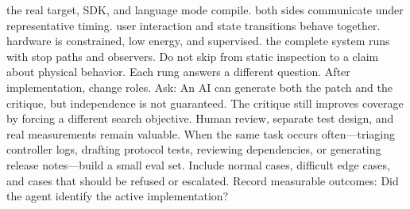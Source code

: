  the real target, SDK, and language mode compile.\markdownRendererOlItemEnd 
{} both sides communicate under representative timing.\markdownRendererOlItemEnd 
{} user interaction and state transitions behave together.\markdownRendererOlItemEnd 
{} hardware is constrained, low energy, and supervised.\markdownRendererOlItemEnd 
{} the complete system runs with stop paths and observers.\markdownRendererOlItemEnd 
\markdownRendererOlEnd \markdownRendererInterblockSeparator
{}Do not skip from static inspection to a claim about physical behavior. Each\markdownRendererSoftLineBreak
{}rung answers a different question.\markdownRendererInterblockSeparator
{}
\markdownRendererSectionEnd \markdownRendererSectionBegin
{}\markdownRendererInterblockSeparator
{}After implementation, change roles. Ask:\markdownRendererInterblockSeparator
{}\markdownRendererInterblockSeparator
{}An AI can generate both the patch and the critique, but independence is not\markdownRendererSoftLineBreak
{}guaranteed. The critique still improves coverage by forcing a different search\markdownRendererSoftLineBreak
{}objective. Human review, separate test design, and real measurements remain\markdownRendererSoftLineBreak
{}valuable.\markdownRendererInterblockSeparator
{}
\markdownRendererSectionEnd \markdownRendererSectionBegin
{}\markdownRendererInterblockSeparator
{}When the same task occurs often—triaging controller logs, drafting protocol\markdownRendererSoftLineBreak
{}tests, reviewing dependencies, or generating release notes—build a small eval\markdownRendererSoftLineBreak
{}set. Include normal cases, difficult edge cases, and cases that should be\markdownRendererSoftLineBreak
{}refused or escalated.\markdownRendererParagraphSeparator
{}Record measurable outcomes:\markdownRendererInterblockSeparator
{}\markdownRendererUlBegin
\markdownRendererUlItem Did the agent identify the active implementation?\markdownRendererUlItemEnd 
